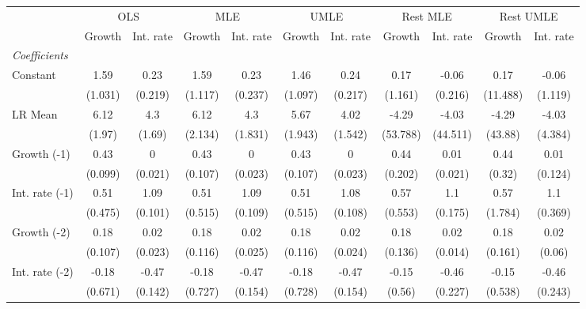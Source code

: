 \begin{table}[htbp] 
	\centering
	\begin{tabular}{@{\extracolsep{4pt}}lcccccccccc@{}}		\hline\hline
		 		 & \multicolumn{2}{c}{OLS} &\multicolumn{2}{c}{MLE} &\multicolumn{2}{c}{UMLE} &\multicolumn{2}{c}{Rest MLE} &\multicolumn{2}{c}{Rest UMLE} \\ 
 		 & Growth 	 & Int. rate 	 & Growth 	 & Int. rate 	 & Growth 	 & Int. rate 	 & Growth 	 & Int. rate 	 & Growth 	 & Int. rate\\\cline{2-3}\cline{4-5}\cline{6-7}\cline{8-9}\cline{10-11}
\rule{0pt}{4ex} 
 \emph{Coefficients} 	  		 & 		 & 		 & 		 & 		 & 		 & 		 & 		 & 		 & 		 &\\ 
\quad Constant 	 & 1.59 	 & 0.23 	 & 1.59 	 & 0.23 	 & 1.46 	 & 0.24 	 & 0.17 	 & -0.06 	 & 0.17 	 & -0.06	 \\ 
 		 & (1.031) 	 & (0.219) 	 & (1.117) 	 & (0.237) 	 & (1.097) 	 & (0.217) 	 & (1.161) 	 & (0.216) 	 & (11.488) 	 & (1.119) 	 \\ 
\quad LR Mean 	 & 6.12 	 & 4.3 	 & 6.12 	 & 4.3 	 & 5.67 	 & 4.02 	 & -4.29 	 & -4.03 	 & -4.29 	 & -4.03	 \\ 
 		 & (1.97) 	 & (1.69) 	 & (2.134) 	 & (1.831) 	 & (1.943) 	 & (1.542) 	 & (53.788) 	 & (44.511) 	 & (43.88) 	 & (4.384) 	 \\ 
\quad Growth (-1) 	 &0.43 	 & 0 	 & 0.43 	 & 0 	 & 0.43 	 & 0 	 & 0.44 	 & 0.01 	 & 0.44 	 & 0.01	 \\ 
 		 & (0.099) 	 & (0.021) 	 & (0.107) 	 & (0.023) 	 & (0.107) 	 & (0.023) 	 & (0.202) 	 & (0.021) 	 & (0.32) 	 & (0.124) 	 \\ 
\quad Int. rate (-1) 	 &0.51 	 & 1.09 	 & 0.51 	 & 1.09 	 & 0.51 	 & 1.08 	 & 0.57 	 & 1.1 	 & 0.57 	 & 1.1	 \\ 
 		 & (0.475) 	 & (0.101) 	 & (0.515) 	 & (0.109) 	 & (0.515) 	 & (0.108) 	 & (0.553) 	 & (0.175) 	 & (1.784) 	 & (0.369) 	 \\ 
\quad Growth (-2) 	 &0.18 	 & 0.02 	 & 0.18 	 & 0.02 	 & 0.18 	 & 0.02 	 & 0.18 	 & 0.02 	 & 0.18 	 & 0.02	 \\ 
 		 & (0.107) 	 & (0.023) 	 & (0.116) 	 & (0.025) 	 & (0.116) 	 & (0.024) 	 & (0.136) 	 & (0.014) 	 & (0.161) 	 & (0.06) 	 \\ 
\quad Int. rate (-2) 	 &-0.18 	 & -0.47 	 & -0.18 	 & -0.47 	 & -0.18 	 & -0.47 	 & -0.15 	 & -0.46 	 & -0.15 	 & -0.46	 \\ 
 		 & (0.671) 	 & (0.142) 	 & (0.727) 	 & (0.154) 	 & (0.728) 	 & (0.154) 	 & (0.56) 	 & (0.227) 	 & (0.538) 	 & (0.243) 	 \\ 

\end{tabular}
\end{table}
